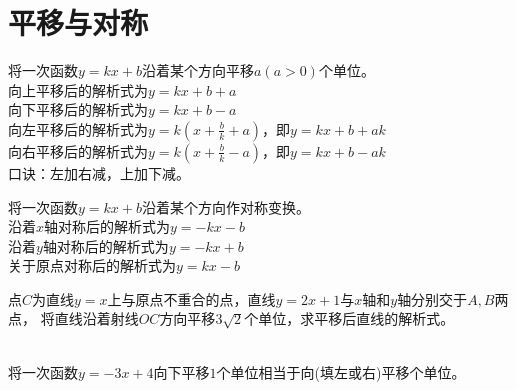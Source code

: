 \documentclass{ecnuthesis}
\begin{document}
\section{平移与对称}
\begin{conclusion}
    将一次函数$y=kx+b$沿着某个方向平移$a(a>0)$个单位。 \\
    向上平移后的解析式为$y=kx+b+a$ \\
    向下平移后的解析式为$y=kx+b-a$ \\
    向左平移后的解析式为$y=k(x+\frac{b}{k}+a)$，即$y=kx+b+ak$ \\
    向右平移后的解析式为$y=k(x+\frac{b}{k}-a)$，即$y=kx+b-ak$ \\
    口诀：左加右减，上加下减。
\end{conclusion}
\begin{conclusion}
    将一次函数$y=kx+b$沿着某个方向作对称变换。\\
    沿着$x$轴对称后的解析式为$y=-kx-b$ \\
    沿着$y$轴对称后的解析式为$y=-kx+b$ \\
    关于原点对称后的解析式为$y=kx-b$
\end{conclusion}
\begin{problem}
    点$C$为直线$y=x$上与原点不重合的点，直线$y=2x+1$与$x$轴和$y$轴分别交于$A,B$两点，
    将直线沿着射线$OC$方向平移$3\sqrt2$个单位，求平移后直线的解析式。\\
    \\
\end{problem}
\begin{problem}
    将一次函数$y=-3x+4$向下平移$1$个单位相当于向\underline{\quad}(填左或右)平移\underline{\quad}个单位。
\end{problem}
\clearpage
\end{document}

